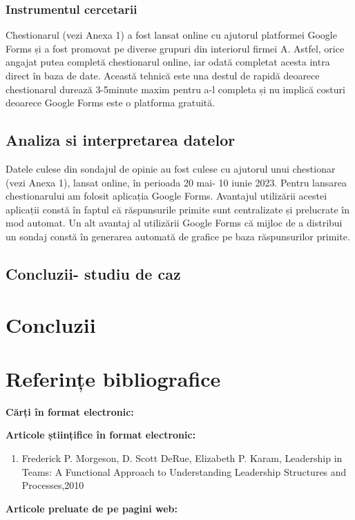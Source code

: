 \documentclass[a4paper, 12pt]{article}
\begin{document}
		\subsubsection{Instrumentul cercetarii}
	\quad Chestionarul (vezi Anexa 1) a fost lansat online cu ajutorul platformei Google Forms și a fost promovat  pe diverse grupuri din interiorul firmei A. Astfel, orice angajat putea completă chestionarul online, iar odată completat acesta intra direct în baza de date. Această tehnică este una destul de rapidă deoarece chestionarul durează 3-5minute maxim pentru a-l completa și nu implică costuri deoarece Google Forms este o platforma gratuită.

	\subsection{Analiza si interpretarea datelor}

	\quad Datele culese din sondajul de opinie au fost culese cu ajutorul unui chestionar (vezi Anexa 1), lansat online, în perioada 20 mai- 10 iunie 2023. Pentru lansarea chestionarului am folosit aplicația Google Forms. Avantajul utilizării acestei aplicații constă în faptul că răspunsurile primite sunt centralizate și prelucrate în mod automat. Un alt avantaj al utilizării Google Forms că mijloc de a distribui un sondaj constă în generarea automată de grafice pe baza răspunsurilor primite. 

	\subsection{ Concluzii- studiu de caz}

\newpage
\setcounter{section}{3}
	\section{Concluzii}	






	
	







\newpage

	\section*{Referințe bibliografice}
	\space
	\bigskip
	\bigskip

	\textbf{Cărți în format electronic:}
	

	\textbf{Articole științifice în format electronic:}
	\begin{enumerate}[1.]
		\item Frederick P. Morgeson, D. Scott DeRue, Elizabeth P. Karam, Leadership in Teams: A Functional Approach to Understanding Leadership Structures and Processes,2010
	\end{enumerate}

	\textbf{Articole preluate de pe pagini web:}
\end{document}

